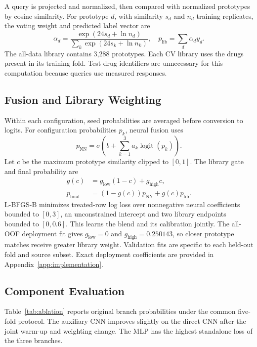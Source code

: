\documentclass[journal]{IEEEtran}
\begin{document}
A query is projected and normalized, then compared with normalized prototypes by cosine similarity. For prototype $d$, with similarity $s_d$ and $n_d$ training replicates, the voting weight and predicted label vector are
\begin{equation}
\alpha_d=\frac{\exp(24s_d+\ln n_d)}{\sum_k\exp(24s_k+\ln n_k)},
\quad p_{\mathrm{lib}}=\sum_d\alpha_d y_d.
\end{equation}
The all-data library contains 3,288 prototypes. Each CV library uses the drugs present in its training fold. Test drug identifiers are unnecessary for this computation because queries use measured responses.

\subsection{Fusion and Library Weighting}
Within each configuration, seed probabilities are averaged before conversion to logits. For configuration probabilities $p_k$, neural fusion uses
\begin{equation}
p_{\mathrm{NN}}=\sigma\!\left(b+\sum_{k=1}^{3}a_k\operatorname{logit}(p_k)\right).
\label{eq:blend}
\end{equation}
Let $c$ be the maximum prototype similarity clipped to $[0,1]$. The library gate and final probability are
\begin{equation}
\begin{aligned}
g(c)&=g_{\mathrm{low}}(1-c)+g_{\mathrm{high}}c,\\
p_{\mathrm{final}}&=(1-g(c))p_{\mathrm{NN}}+g(c)p_{\mathrm{lib}}.
\end{aligned}
\label{eq:libmix}
\end{equation}
L-BFGS-B minimizes treated-row log loss over nonnegative neural coefficients bounded to $[0,3]$, an unconstrained intercept and two library endpoints bounded to $[0,0.6]$. This learns the blend and its calibration jointly. The all-OOF deployment fit gives $g_{\mathrm{low}}=0$ and $g_{\mathrm{high}}=0.250143$, so closer prototype matches receive greater library weight. Validation fits are specific to each held-out fold and source subset. Exact deployment coefficients are provided in Appendix~\ref{app:implementation}.

\subsection{Component Evaluation}
Table~\ref{tab:ablation} reports original branch probabilities under the common five-fold protocol. The auxiliary CNN improves slightly on the direct CNN after the joint warm-up and weighting change. The MLP has the highest standalone loss of the three branches.
\end{document}

